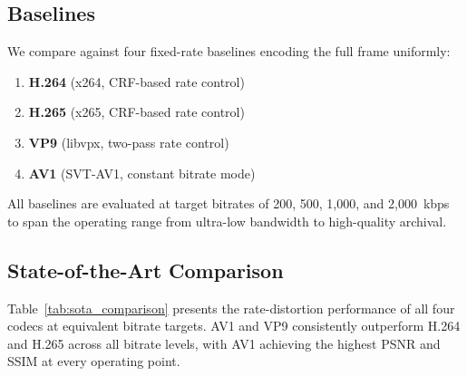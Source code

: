 \subsection{Baselines}

We compare against four fixed-rate baselines encoding the full frame uniformly:

\begin{enumerate}
    \item \textbf{H.264} (x264, CRF-based rate control)
    \item \textbf{H.265} (x265, CRF-based rate control)
    \item \textbf{VP9} (libvpx, two-pass rate control)
    \item \textbf{AV1} (SVT-AV1, constant bitrate mode)
\end{enumerate}

All baselines are evaluated at target bitrates of 200, 500, 1{,}000, and 2{,}000~kbps to span the operating range from ultra-low bandwidth to high-quality archival.

\subsection{State-of-the-Art Comparison}

Table~\ref{tab:sota_comparison} presents the rate-distortion performance of all four codecs at equivalent bitrate targets. AV1 and VP9 consistently outperform H.264 and H.265 across all bitrate levels, with AV1 achieving the highest PSNR and SSIM at every operating point.

